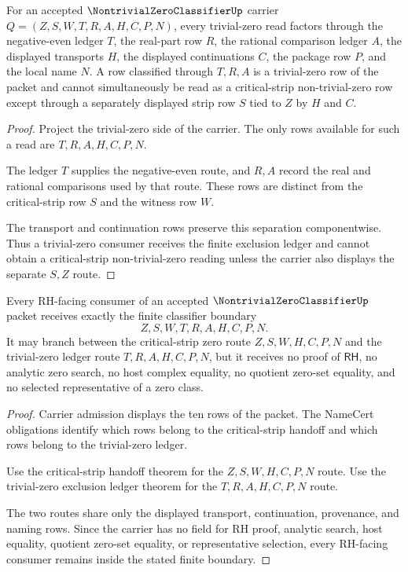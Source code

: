 \begin{theorem}
\label{thm:nontrivial-zero-classifier-trivial-zero-exclusion-ledger}
For an accepted $\NontrivialZeroClassifierUp$ carrier $Q=(Z,S,W,T,R,A,H,C,P,N)$, every trivial-zero read factors through the negative-even ledger $T$, the real-part row $R$, the rational comparison ledger $A$, the displayed transports $H$, the displayed continuations $C$, the package row $P$, and the local name $N$. A row classified through $T,R,A$ is a trivial-zero row of the packet and cannot simultaneously be read as a critical-strip non-trivial-zero row except through a separately displayed strip row $S$ tied to $Z$ by $H$ and $C$.
\end{theorem}
\begin{proof}
Project the trivial-zero side of the carrier. The only rows available for such a read are $T,R,A,H,C,P,N$.

The ledger $T$ supplies the negative-even route, and $R,A$ record the real and rational comparisons used by that route. These rows are distinct from the critical-strip row $S$ and the witness row $W$.

The transport and continuation rows preserve this separation componentwise. Thus a trivial-zero consumer receives the finite exclusion ledger and cannot obtain a critical-strip non-trivial-zero reading unless the carrier also displays the separate $S,Z$ route.
\end{proof}

\begin{theorem}
\label{thm:nontrivial-zero-classifier-rh-consumer-boundary}
Every RH-facing consumer of an accepted $\NontrivialZeroClassifierUp$ packet receives exactly the finite classifier boundary
$$
Z,S,W,T,R,A,H,C,P,N.
$$
It may branch between the critical-strip zero route $Z,S,W,H,C,P,N$ and the trivial-zero ledger route $T,R,A,H,C,P,N$, but it receives no proof of $\mathsf{RH}$, no analytic zero search, no host complex equality, no quotient zero-set equality, and no selected representative of a zero class.
\end{theorem}
\begin{proof}
Carrier admission displays the ten rows of the packet. The NameCert obligations identify which rows belong to the critical-strip handoff and which rows belong to the trivial-zero ledger.

Use the critical-strip handoff theorem for the $Z,S,W,H,C,P,N$ route. Use the trivial-zero exclusion ledger theorem for the $T,R,A,H,C,P,N$ route.

The two routes share only the displayed transport, continuation, provenance, and naming rows. Since the carrier has no field for RH proof, analytic search, host equality, quotient zero-set equality, or representative selection, every RH-facing consumer remains inside the stated finite boundary.
\end{proof}

